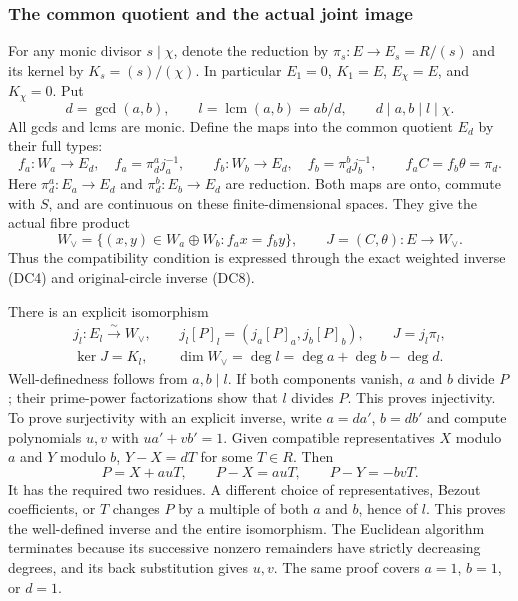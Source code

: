 \subsubsection{The common quotient and the actual joint image}

For any monic divisor $s\mid\chi$, denote the reduction by
$\pi_s:E\to E_s=R/(s)$ and its kernel by $K_s=(s)/(\chi)$.
In particular $E_1=0$, $K_1=E$, $E_\chi=E$, and $K_\chi=0$.
Put
\[
 d=\gcd(a,b),\qquad l=\operatorname{lcm}(a,b)=ab/d,\qquad
 d\mid a,b\mid l\mid\chi .
 \tag{DC9}
\]
All gcds and lcms are monic.  Define the maps into the common quotient
$E_d$ by their full types:
\[
 f_a:W_a\to E_d,\quad f_a=\pi_d^a j_a^{-1},\qquad
 f_b:W_b\to E_d,\quad f_b=\pi_d^b j_b^{-1},
 \qquad f_a C=f_b\theta=\pi_d .
 \tag{DC10}
\]
Here $\pi_d^a:E_a\to E_d$ and $\pi_d^b:E_b\to E_d$ are reduction.
Both maps are onto, commute with $S$, and are continuous on these
finite-dimensional spaces.  They give the actual fibre product
\[
 W_\vee=
 \{(x,y)\in W_a\oplus W_b:f_a x=f_b y\},\qquad
 J=(C,\theta):E\to W_\vee .
 \tag{DC11}
\]
Thus the compatibility condition is expressed through the exact
weighted inverse (DC4) and original-circle inverse (DC8).

There is an explicit isomorphism
\[
 \begin{gathered}
 j_l:E_l\xrightarrow{\sim}W_\vee,\qquad
 j_l[P]_l=(j_a[P]_a,j_b[P]_b),\qquad J=j_l\pi_l,\\
 \ker J=K_l,\qquad
 \dim W_\vee=\deg l=\deg a+\deg b-\deg d .
 \end{gathered}
 \tag{DC12}
\]
Well-definedness follows from $a,b\mid l$.  If both components vanish,
$a$ and $b$ divide $P$; their prime-power factorizations show that $l$
divides $P$.  This proves injectivity.  To prove surjectivity with an
explicit inverse, write $a=da'$, $b=db'$ and compute polynomials
$u,v$ with $ua'+vb'=1$.  Given compatible representatives
$X$ modulo $a$ and $Y$ modulo $b$, $Y-X=dT$ for some $T\in R$.
Then
\[
 P=X+auT,\qquad
 P-X=auT,\qquad P-Y=-bvT.
 \tag{DC13}
\]
It has the required two residues.  A different choice of
representatives, Bezout coefficients, or $T$ changes $P$ by a
multiple of both $a$ and $b$, hence of $l$.  This proves the
well-defined inverse and the entire isomorphism.  The Euclidean
algorithm terminates because its successive nonzero remainders have
strictly decreasing degrees, and its back substitution gives $u,v$.
The same proof covers $a=1$, $b=1$, or $d=1$.

